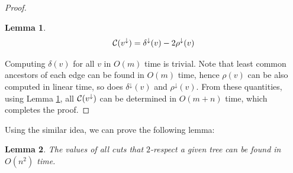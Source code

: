 \documentclass[11pt]{article}
\newcommand{\descendants}[1]{#1^\downarrow}
\newcommand{\cutval}[1]{{\cal C}(#1)}
\theoremstyle{plain}
\newtheorem{lemma}{Lemma}[section]
\begin{document}
\begin{proof}
    \begin{lemma}
        \label{lemma:delta}
        \begin{align*}
            \cutval{\descendants{v}} = \descendants{\delta}(v)-2\descendants{\rho}(v)
        \end{align*}
    \end{lemma}

    Computing $\delta(v)$ for all $v$ in $O(m)$ time is trivial. Note that least common ancestors of each edge can be found in $O(m)$ time\cite{gabow1983linear}, hence $\rho(v)$ can be also computed in linear time, so does $\descendants{\delta}(v)$ and $\descendants{\rho}(v)$. From these quantities, using Lemma \ref{lemma:delta}, all $\cutval{\descendants{v}}$ can be determined in $O(m+n)$ time, which completes the proof.
\end{proof}

Using the similar idea, we can prove the following lemma:

\begin{lemma}
    \label{lemma:respect}
    The values of all cuts that $2$-respect a given tree can be found in $O(n^2)$ time.
\end{lemma}
\end{document}

